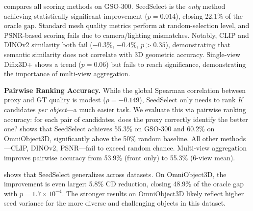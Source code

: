  compares all scoring methods on GSO-300. SeedSelect is the \emph{only} method achieving statistically significant improvement ($p{=}0.014$), closing 22.1\% of the oracle gap. Standard mesh quality metrics perform at random-selection level, and PSNR-based scoring fails due to camera/lighting mismatches. Notably, CLIP and DINOv2 similarity both fail ($-0.3\%$, $-0.4\%$, $p{>}0.35$), demonstrating that semantic similarity does not correlate with 3D geometric accuracy. Single-view Difix3D+ shows a trend ($p{=}0.06$) but fails to reach significance, demonstrating the importance of multi-view aggregation.

\noindent\textbf{Pairwise Ranking Accuracy.}
While the global Spearman correlation between proxy and GT quality is modest ($\rho{=}{-}0.149$), SeedSelect only needs to rank $K$ candidates \emph{per object}---a much easier task. We evaluate this via pairwise ranking accuracy: for each pair of candidates, does the proxy correctly identify the better one?  shows that SeedSelect achieves 55.3\% on GSO-300 and 60.2\% on OmniObject3D, significantly above the 50\% random baseline. All other methods---CLIP, DINOv2, PSNR---fail to exceed random chance. Multi-view aggregation improves pairwise accuracy from 53.9\% (front only) to 55.3\% (6-view mean).

\begin{table}[t]
\centering
\caption{\textbf{Pairwise ranking accuracy.} Fraction of candidate pairs where the proxy correctly identifies the better reconstruction. SeedSelect is the only method exceeding random chance (50\%).}
\label{tab:pairwise}
\end{table}

 shows that SeedSelect generalizes across datasets. On OmniObject3D, the improvement is even larger: 5.8\% CD reduction, closing 48.9\% of the oracle gap with $p{=}1.7 \times 10^{-4}$. The stronger results on OmniObject3D likely reflect higher seed variance for the more diverse and challenging objects in this dataset.


